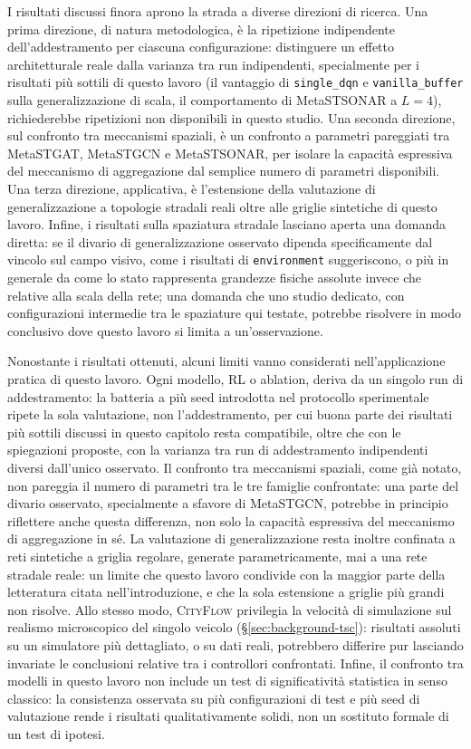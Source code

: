 I risultati discussi finora aprono la strada a diverse direzioni di
ricerca. Una prima direzione, di natura metodologica, è la ripetizione
indipendente dell'addestramento per ciascuna configurazione: distinguere
un effetto architetturale reale dalla varianza tra run indipendenti,
specialmente per i risultati più sottili di questo lavoro (il vantaggio
di \texttt{single\_dqn} e \texttt{vanilla\_buffer} sulla generalizzazione
di scala, il comportamento di MetaSTSONAR a $L=4$), richiederebbe
ripetizioni non disponibili in questo studio. Una seconda direzione,
sul confronto tra meccanismi spaziali, è un confronto a parametri
pareggiati tra MetaSTGAT, MetaSTGCN e MetaSTSONAR, per isolare la
capacità espressiva del meccanismo di aggregazione dal semplice numero di
parametri disponibili. Una terza direzione, applicativa, è l'estensione
della valutazione di generalizzazione a topologie stradali reali oltre
alle griglie sintetiche di questo lavoro. Infine, i risultati sulla
spaziatura stradale lasciano aperta una domanda diretta: se il divario di
generalizzazione osservato dipenda specificamente dal vincolo sul campo
visivo, come i risultati di \texttt{environment} suggeriscono, o più in
generale da come lo stato rappresenta grandezze fisiche assolute invece
che relative alla scala della rete; una domanda che uno studio dedicato,
con configurazioni intermedie tra le spaziature qui testate, potrebbe
risolvere in modo conclusivo dove questo lavoro si limita a
un'osservazione.

Nonostante i risultati ottenuti, alcuni limiti vanno considerati
nell'applicazione pratica di questo lavoro. Ogni modello, RL o ablation,
deriva da un singolo run di addestramento: la batteria a più seed
introdotta nel protocollo sperimentale ripete la sola valutazione, non
l'addestramento, per cui buona parte dei risultati più sottili discussi
in questo capitolo resta compatibile, oltre che con le spiegazioni
proposte, con la varianza tra run di addestramento indipendenti diversi
dall'unico osservato. Il confronto tra meccanismi spaziali, come già
notato, non pareggia il numero di parametri tra le tre famiglie
confrontate: una parte del divario osservato, specialmente a sfavore di
MetaSTGCN, potrebbe in principio riflettere anche questa differenza, non
solo la capacità espressiva del meccanismo di aggregazione in sé. La
valutazione di generalizzazione resta inoltre confinata a reti sintetiche
a griglia regolare, generate parametricamente, mai a una rete stradale
reale: un limite che questo lavoro condivide con la maggior parte della
letteratura citata nell'introduzione, e che la sola estensione a griglie
più grandi non risolve. Allo stesso modo, \textsc{CityFlow} privilegia la
velocità di simulazione sul realismo microscopico del singolo veicolo
(§\ref{sec:background-tsc}): risultati assoluti su un simulatore più
dettagliato, o su dati reali, potrebbero differire pur lasciando invariate
le conclusioni relative tra i controllori confrontati. Infine, il
confronto tra modelli in questo lavoro non include un test di
significatività statistica in senso classico: la consistenza osservata su
più configurazioni di test e più seed di valutazione rende i risultati
qualitativamente solidi, non un sostituto formale di un test di ipotesi.
